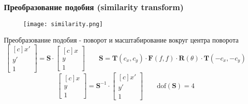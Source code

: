 \documentclass[
    12pt, 
    usepdftitle=false,
    aspectratio=1610
]{beamer}
\begin{document}
\begin{frame}
    \frametitle{Преобразование подобия (similarity transform)}
    \begin{figure}[t]
        \texttt{[image: similarity.png]}
    \end{figure}
    Преобразование подобия - поворот и масштабирование вокруг центра поворота
    $$
        \begin{bmatrix*}[c]
            x' \\ y' \\ 1    
        \end{bmatrix*}=
        \mathbf{S}\cdot
        \begin{bmatrix*}[c]
            x \\ y \\ 1    
        \end{bmatrix*}\qquad
        \mathbf{S}=
        \mathbf{T}(c_x,c_y)\cdot
        \mathbf{F}(f, f)\cdot
        \mathbf{R}(\theta)\cdot
        \mathbf{T}(-c_x,-c_y)
    $$
    $$
        \begin{bmatrix*}[c]
            x \\ y \\ 1    
        \end{bmatrix*}=
        \mathbf{S}^{-1}\cdot
        \begin{bmatrix*}[c]
            x' \\ y' \\ 1    
        \end{bmatrix*}
        \qquad
        \mathrm{dof}\left(\mathbf{S}\right)=4
    $$
\end{frame}
\end{document}
